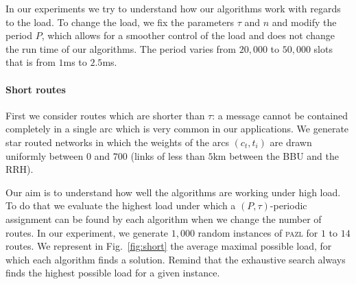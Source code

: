 \documentclass[10pt, conference, letterpaper]{IEEEtran}
\newcommand\pazl{\textsc{pazl}\xspace}
\begin{document}

       In our experiments we try to understand how our algorithms work with regards to the load. To change the load, we fix the parameters $\tau$ and $n$ and modify the period $P$, which allows for a smoother control of the load and does not change the run time of our algorithms. The period varies from $20,000$ to $50,000$ slots that is from $1$ms to $2.5$ms.
      

      \paragraph{Short routes}
      
      First we consider routes which are shorter than $\tau$: a message cannot be contained completely in a single arc which is very common in our applications. We generate star routed networks in which the weights of the arcs $(c_t,t_i)$ are drawn uniformly between $0$ and $700$ (links of less than $5$km between the BBU and the RRH). 
      
      Our aim is to understand how well the algorithms are working under high load. To do that we evaluate the highest load 
      under which a $(P,\tau)$-periodic assignment can be found by each algorithm when we change the number of routes. 
      In our experiment, we generate $1,000$ random instances of \pazl for $1$ to $14$ routes. We represent in Fig.~\ref{fig:short} the average maximal possible load, for which each algorithm finds a solution. Remind that the exhaustive search always finds the highest possible load for a given instance. 
      
\end{document}
